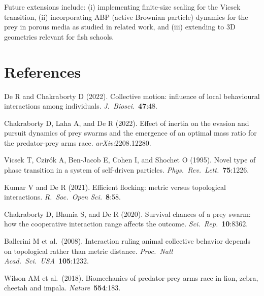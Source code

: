 \documentclass[11pt,a4paper]{article}
\begin{document}
Future extensions include: (i) implementing finite-size scaling for the
Vicsek transition, (ii) incorporating ABP (active Brownian particle)
dynamics for the prey in porous media as studied in related work, and
(iii) extending to 3D geometries relevant for fish schools.

\section*{References}

\begin{enumerate}[label={[\arabic*]}, leftmargin=*, itemsep=3pt]

\item De R and Chakraborty D (2022). Collective motion: influence of local
  behavioural interactions among individuals.
  \textit{J.\ Biosci.}\ \textbf{47}:48.

\item Chakraborty D, Laha A, and De R (2022). Effect of inertia on the
  evasion and pursuit dynamics of prey swarms and the emergence of an
  optimal mass ratio for the predator-prey arms race.
  \textit{arXiv:}2208.12280.

\item Vicsek T, Czir\'{o}k A, Ben-Jacob E, Cohen I, and Shochet O (1995).
  Novel type of phase transition in a system of self-driven particles.
  \textit{Phys.\ Rev.\ Lett.}\ \textbf{75}:1226.

\item Kumar V and De R (2021). Efficient flocking: metric versus topological
  interactions.
  \textit{R.\ Soc.\ Open Sci.}\ \textbf{8}:58.

\item Chakraborty D, Bhunia S, and De R (2020). Survival chances of a prey
  swarm: how the cooperative interaction range affects the outcome.
  \textit{Sci.\ Rep.}\ \textbf{10}:8362.

\item Ballerini M et al.\ (2008). Interaction ruling animal collective
  behavior depends on topological rather than metric distance.
  \textit{Proc.\ Natl Acad.\ Sci.\ USA}\ \textbf{105}:1232.

\item Wilson AM et al.\ (2018). Biomechanics of predator-prey arms race in
  lion, zebra, cheetah and impala.
  \textit{Nature}\ \textbf{554}:183.

\end{enumerate}
\end{document}
